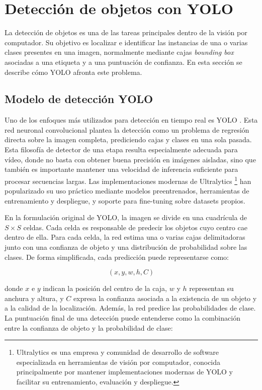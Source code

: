 \section{Detección de objetos con YOLO}
\label{sec:yolo-tecnologias}

La detección de objetos es una de las tareas principales dentro de la visión por computador. Su objetivo es localizar e identificar las instancias de una o varias clases presentes en una imagen, normalmente mediante cajas \textit{bounding box} asociadas a una etiqueta y a una puntuación de confianza. En esta sección se describe cómo YOLO afronta este problema.

\subsection{Modelo de detección YOLO}

Uno de los enfoques más utilizados para detección en tiempo real es YOLO \citep{RedmonYOLO2016}. Esta red neuronal convolucional plantea la detección como un problema de regresión directa sobre la imagen completa, prediciendo cajas y clases en una sola pasada. Esta filosofía de detector de una etapa resulta especialmente adecuada para vídeo, donde no basta con obtener buena precisión en imágenes aisladas, sino que también es importante mantener una velocidad de inferencia suficiente para procesar secuencias largas. Las implementaciones modernas de Ultralytics \citep{UltralyticsYOLO2023} \footnote{Ultralytics es una empresa y comunidad de desarrollo de software especializada en herramientas de visión por computador, conocida principalmente por mantener implementaciones modernas de YOLO y facilitar su entrenamiento, evaluación y despliegue.} han popularizado su uso práctico mediante modelos preentrenados, herramientas de entrenamiento y despliegue, y soporte para fine-tuning sobre datasets propios.


En la formulación original de YOLO, la imagen se divide en una cuadrícula de $S \times S$ celdas. Cada celda es responsable de predecir los objetos cuyo centro cae dentro de ella. Para cada celda, la red estima una o varias cajas delimitadoras junto con una confianza de objeto y una distribución de probabilidad sobre las clases. De forma simplificada, cada predicción puede representarse como:

\[
(x, y, w, h, C)
\]

donde $x$ e $y$ indican la posición del centro de la caja, $w$ y $h$ representan su anchura y altura, y $C$ expresa la confianza asociada a la existencia de un objeto y a la calidad de la localización. Además, la red predice las probabilidades de clase. La puntuación final de una detección puede entenderse como la combinación entre la confianza de objeto y la probabilidad de clase:

